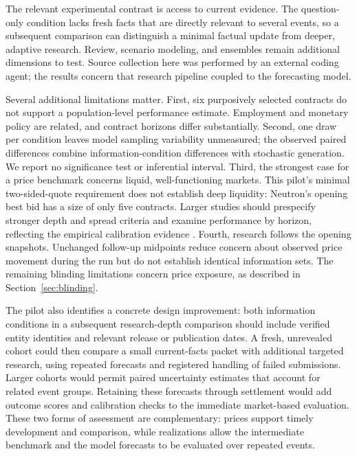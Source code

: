 \documentclass[11pt,letterpaper]{article}
\begin{document}
The relevant experimental contrast is access to current evidence. The
question-only condition lacks fresh facts that are directly relevant to
several events, so a subsequent comparison can distinguish a minimal factual
update from deeper, adaptive research. Review, scenario modeling, and
ensembles remain additional dimensions to test. Source collection here was
performed by an external coding agent; the results concern that research
pipeline coupled to the forecasting model.

Several additional limitations matter. First, six purposively selected
contracts do not support a population-level performance estimate. Employment
and monetary policy are related, and contract horizons differ substantially.
Second, one draw per condition leaves model sampling variability unmeasured;
the observed paired differences combine information-condition differences
with stochastic generation. We report no significance test or inferential
interval. Third, the strongest case for a price benchmark concerns liquid,
well-functioning markets. This pilot's minimal two-sided-quote requirement
does not establish deep liquidity: Neutron's opening best bid has a size of
only five contracts. Larger studies should prespecify stronger depth and
spread criteria and examine performance by horizon, reflecting the empirical
calibration evidence \cite{page2013}. Fourth,
research follows the opening snapshots. Unchanged follow-up midpoints reduce
concern about observed price movement during the run but do not establish
identical information sets. The remaining blinding limitations concern price
exposure, as described in Section~\ref{sec:blinding}.

The pilot also identifies a concrete design improvement: both information
conditions in a subsequent research-depth comparison should include verified
entity identities and relevant release or publication dates. A fresh,
unrevealed cohort could then compare a small current-facts packet with
additional targeted research, using repeated forecasts and registered
handling of failed submissions. Larger cohorts would permit paired
uncertainty estimates that account for related event groups. Retaining these
forecasts through settlement would add outcome scores and calibration checks
to the immediate market-based evaluation. These two forms of assessment are
complementary: prices support timely development and comparison, while
realizations allow the intermediate benchmark and the model forecasts to be
evaluated over repeated events.
\end{document}
